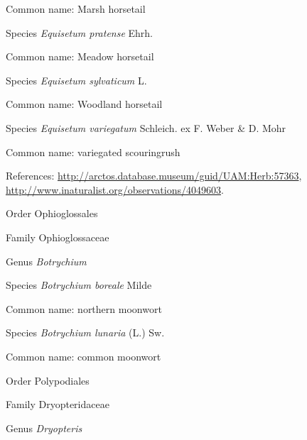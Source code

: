 \documentclass[9pt, article]{memoir}
\begin{document}
\begin{multicols}{2}
Common name: Marsh horsetail

\vspace{6pt}\noindent\hspace{36pt}Species \textit{Equisetum pratense} Ehrh.


Common name: Meadow horsetail

\vspace{6pt}\noindent\hspace{36pt}Species \textit{Equisetum sylvaticum} L.


Common name: Woodland horsetail

\vspace{6pt}\noindent\hspace{36pt}Species \textit{Equisetum variegatum} Schleich. ex F. Weber \& D. Mohr


Common name: variegated scouringrush

References: 
\url{http://arctos.database.museum/guid/UAM:Herb:57363}, 
\url{http://www.inaturalist.org/observations/4049603}.

\vspace{6pt}\noindent\hspace{18pt}Order Ophioglossales


\vspace{6pt}\noindent\hspace{24pt}Family Ophioglossaceae


\vspace{6pt}\noindent\hspace{30pt}Genus \textit{Botrychium}


\vspace{6pt}\noindent\hspace{36pt}Species \textit{Botrychium boreale} Milde


Common name: northern moonwort

\vspace{6pt}\noindent\hspace{36pt}Species \textit{Botrychium lunaria} (L.) Sw.


Common name: common moonwort

\vspace{6pt}\noindent\hspace{18pt}Order Polypodiales


\vspace{6pt}\noindent\hspace{24pt}Family Dryopteridaceae


\vspace{6pt}\noindent\hspace{30pt}Genus \textit{Dryopteris}



\end{multicols}
\end{document}

